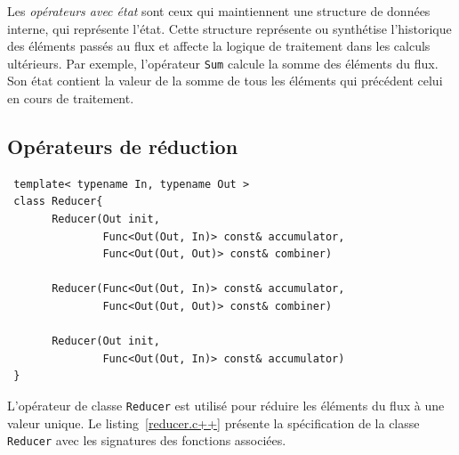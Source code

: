 Les \emph{op\'erateurs avec \'etat} sont ceux qui maintiennent une structure de donn\'ees interne, qui repr\'esente l'\'etat. Cette structure repr\'esente ou synth\'etise l'historique des \'el\'ements pass\'es au flux et affecte la logique de traitement dans les calculs ult\'erieurs. Par exemple, l'op\'erateur \texttt{Sum} calcule la somme des \'el\'ements du flux. Son \'etat contient la valeur de la somme de tous les \'el\'ements qui pr\'ec\'edent celui en cours de traitement. 

\subsection*{Op\'erateurs de r\'eduction}

\label{reducer.sect}

\begin{Listing}[tbp]
\begin{lstlisting}
 template< typename In, typename Out >
 class Reducer{
       Reducer(Out init, 
               Func<Out(Out, In)> const& accumulator,
               Func<Out(Out, Out)> const& combiner)

       Reducer(Func<Out(Out, In)> const& accumulator,
               Func<Out(Out, Out)> const& combiner)

       Reducer(Out init, 
               Func<Out(Out, In)> const& accumulator)
 }
\end{lstlisting}
\caption{La signature pour l'op\'erateur \texttt{Reducer}.}
\label{reducer.c++}
\end{Listing}



L'op\'erateur de classe \texttt{Reducer} est utilis\'e pour r\'eduire les \'el\'ements du flux \`a une valeur unique. Le listing~\ref{reducer.c++} présente la spécification  de la classe \texttt{Reducer} avec les signatures des fonctions associées. 

